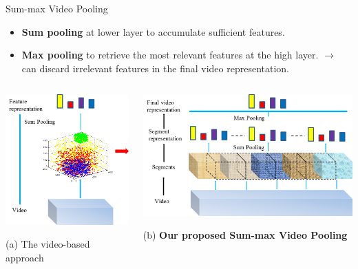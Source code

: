 \documentclass{beamer}
\begin{document}
\begin{frame}{Sum-max Video Pooling} 
	\begin{itemize}
\item \textbf{Sum pooling} at lower layer to accumulate sufficient features.
\item \textbf{Max pooling} to retrieve the most relevant features at the high layer.
$\rightarrow$ can discard irrelevant features in the final video representation.
	\end{itemize}

\begin{columns}
  \begin{column}{0.3\textwidth}
    \centerline{\includegraphics[width=1\textwidth]{images/video_based_summax2.png}}
    (a) The video-based approach
  \end{column}

  \begin{column}{0.7\textwidth}
    \centerline{\includegraphics[width=1\textwidth]{images/segment_based_summax.png}}
    (b) \textbf{Our proposed Sum-max Video Pooling}
  \end{column}
\end{columns}
\bigskip
 
  
\end{frame}
\end{document}
